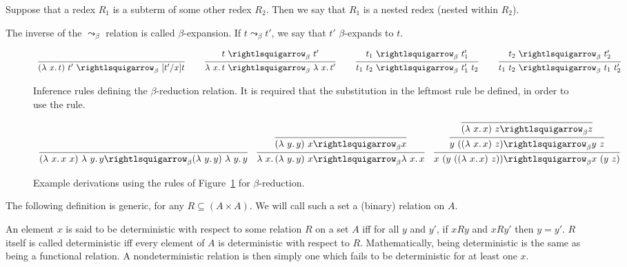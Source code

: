 \begin{definition}
  Suppose that a redex $R_1$ is a subterm of some other redex $R_2$.
  Then we say that $R_1$ is a nested redex (nested within $R_2$).
  \end{definition}
 
\begin{definition}
\label{def:betaexpand}
  The inverse of the $\leadsto_\beta$ relation is called
  $\beta$-expansion.  If $t \leadsto_\beta t'$, we say
  that $t'$ $\beta$-expands to $t$.
\end{definition}

\begin{figure}
  \[
  \begin{array}{lllllll}
\infer{(\lam{x}{t})\ t'\ \curva_\beta\ [t'/x]t}{\ } & \ &
\infer{\lam{x}{t}\ \curva_\beta\ \lam{x}{t'}}{t\ \curva_\beta\ t'} & \ &
\infer{t_1\ t_2\ \curva_\beta\ t_1'\ t_2}{t_1\ \curva_\beta\ t_1'} &\ &
\infer{t_1\ t_2\ \curva_\beta\ t_1\ t_2'}{t_2\ \curva_\beta\ t_2'}
  \end{array}
  \]
  \caption{Inference rules defining the $\beta$-reduction relation.  It is required that the substitution in the leftmost rule be defined, in order to use the rule.}
  \label{fig:betar}
\end{figure}

\begin{figure}
  \[
  \begin{array}{lll}
    \infer{(\lam{x}{x\ x})\ \lam{y}{y} \betar (\lam{y}{y})\ \lam{y}{y}}
          {\ }
    &
    \infer{\lam{x}{(\lam{y}{y})\ x} \betar \lam{x}{x}}
          {\infer{(\lam{y}{y})\ x \betar x}{\ }}

    &

    \infer{x\ (y\ ((\lam{x}{x})\ z)) \betar x\ (y\ z)}
          {\infer{y\ ((\lam{x}{x})\ z) \betar y\ z}
            {\infer{(\lam{x}{x})\ z \betar z}{\ }}}
  \end{array}
\]
\caption{Example derivations using the rules of Figure~\ref{fig:betar} for $\beta$-reduction.}
\label{fig:betarex}
\end{figure}

\noindent The following definition is generic, for any $R\subseteq (A\times A)$.  We will call such
a set a (binary) relation on $A$.

\begin{definition}[determinism]
\label{def:det}
  An element $x$ is said to be deterministic with respect to some
  relation $R$ on a set $A$ iff for all $y$ and $y'$, if $x R y$ and
  $x R y'$ then $y = y'$.  $R$ itself is called deterministic iff
  every element of $A$ is deterministic with respect to $R$.
  Mathematically, being deterministic is the same as being a
  functional relation.  A nondeterministic relation is then simply one
  which fails to be deterministic for at least one
  $x$.
  \end{definition}

